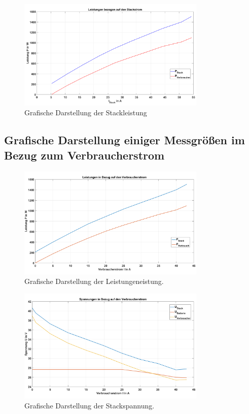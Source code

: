 \begin{figure}[H]
  \centering
  \includegraphics[width=0.8\textwidth]{Abbildungen/Aufgabe62_P.png}
  \caption{Grafische Darstellung der Stackleistung}
  \label{fig:230626_Stackleistung}
\end{figure}


\subsection{Grafische Darstellung einiger Messgrößen im Bezug zum Verbraucherstrom}

\begin{figure}[H]
    \centering
    \includegraphics[width=0.8\textwidth]{Abbildungen/Aufgabe63_Leistungen_P.png}
    \caption{Grafische Darstellung der Leistungeneistung.}
    \label{fig:230626_Leistungen}
\end{figure}

\begin{figure}[H]
  \centering
  \includegraphics[width=0.8\textwidth]{Abbildungen/Aufgabe63_Leistungen_U.png}
  \caption{Grafische Darstellung der Stackspannung.}
  \label{fig:230626_Spannungen}
\end{figure}

